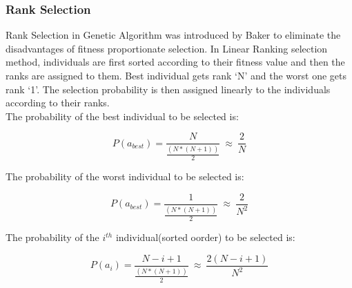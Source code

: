 \documentclass[a4paper, 12pt]{article}
\begin{document}
\subsubsection{Rank Selection}
Rank Selection in Genetic Algorithm was introduced by Baker to eliminate the disadvantages of fitness proportionate selection. In Linear 
Ranking selection method, individuals are first sorted according to their fitness value and then the ranks are assigned to them. Best 
individual gets rank ‘N’ and the worst one gets rank ‘1’. The selection probability is then assigned linearly to the individuals according to 
their ranks.\\
The probability of the best individual to be selected is:
\begin{large}
\boldmath\begin{equation*}
P\left(a_{best}\right) = \frac{N}{\frac{\left(N*\left(N+1\right)\right)}{2}}\ \approx\ \frac{2}{N}
\end{equation*}
\end{large}
The probability of the worst individual to be selected is:
\begin{large}
\boldmath\begin{equation*}
P\left(a_{best}\right) = \frac{1}{\frac{\left(N*\left(N+1\right)\right)}{2}}\ \approx\ \frac{2}{N^2}
\end{equation*}
\end{large}
The probability of the $i^{th}$ individual(sorted oorder) to be selected is:
\begin{large}
\boldmath\begin{equation*}
P\left(a_i\right) = \frac{N-i+1}{\frac{\left(N*\left(N+1\right)\right)}{2}}\ \approx\ \frac{2\left(N-i+1\right)}{N^2}
\end{equation*}
\end{large}
\end{document}
